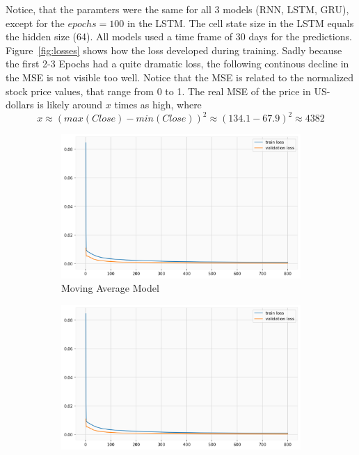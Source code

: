 \documentclass[utf8x]{ctexart}
\begin{document}
Notice, that the paramters were the same for all 3 models (RNN, LSTM, GRU), except for the $epochs = 100$ in the LSTM. The cell state size in the LSTM equals the hidden size (64).
All models used a time frame of 30 days for the predictions. Figure~\ref{fig:losses} shows how the loss developed during training. Sadly because the first 2-3 Epochs had a quite dramatic loss, the following continous decline in the MSE is not visible too well. Notice that the MSE is related to the normalized stock price values, that range from 0 to 1. The real MSE of the price in US-dollars is likely around $x$ times as high, where
\[ x \approx (max(Close) - min(Close))^2 \approx (134.1 - 67.9)^2 \approx 4382 \]


\begin{figure}[htb]
  \centering
  \begin{subfigure}[b]{0.48\textwidth}
    \centering
    \includegraphics[width=\textwidth]{../images/ma_losses.png}
    \caption{Moving Average Model}
    \label{fig:ma_losses}
  \end{subfigure}
  \begin{subfigure}[b]{0.48\textwidth}
    \centering
    \includegraphics[width=\textwidth]{../images/rnn_losses.png}

\end{subfigure}
\end{figure}
\end{document}
